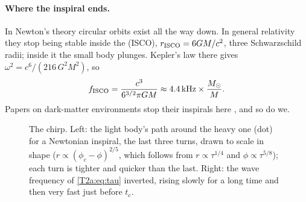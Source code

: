 \paragraph{Where the inspiral ends.}
In Newton's theory circular orbits exist all the way down. In general relativity they stop being stable inside the  (ISCO), $r_{\rm ISCO}=6GM/c^2$, three Schwarzschild radii; inside it the small body plunges. Kepler's law there gives $\omega^2=c^6/(216\,G^2M^2)$, so
\begin{equation}
  f_{\rm ISCO}=\frac{c^3}{6^{3/2}\pi GM}\approx 4.4\,\mathrm{kHz}\times\frac{M_\odot}{M}.
  \label{T2a:eq:fisco}
\end{equation}
Papers on dark-matter environments stop their inspirals here \cite{Eda2015,Kim2023}, and so do we.

\begin{figure}[htbp]
\centering
{}
\caption{The chirp. Left: the light body's path around the heavy one (dot) for a Newtonian inspiral, the last three turns, drawn to scale in shape ($r\propto(\phi_c-\phi)^{2/5}$, which follows from $r\propto\tau^{1/4}$ and $\phi\propto\tau^{5/8}$); each turn is tighter and quicker than the last. Right: the wave frequency of \eqref{T2a:eq:tau} inverted, rising slowly for a long time and then very fast just before $t_c$.}
\label{T2a:fig:chirp-cartoon}
\end{figure}

